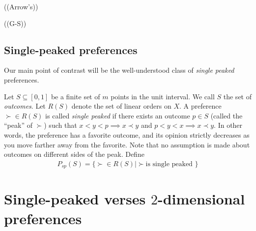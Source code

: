 \documentclass[12pt]{article}
\newcommand{\1}[1]{\mathds{1}[{#1}]}
\begin{document}
    ((Arrow's))

    ((G-S))

  \subsection{Single-peaked preferences}
    Our main point of contrast will be the well-understood class of
    \emph{single peaked} preferences.

    Let $S\subseteq [0,1]$ be a finite set of $m$ points in the unit interval.
    We call $S$ the set of \emph{outcomes}.
    Let $R(S)$ denote the set of linear orders on $X$.
    A preference $\succ \in R(S)$ is called \emph{single peaked} if
    there exists an outcome $p\in S$ (called the ``peak'' of $\succ$)
    such that $x < y < p \implies x \prec y$ and $p < y < x \implies x \prec y$.
    In other words, the preference has a favorite outcome,
    and its opinion strictly decreases as you move farther away from the favorite.
    Note that no assumption is made about outcomes on different sides of the peak.
    Define
    \begin{align*}
      P_{sp}(S) = \{ \succ \in R(S) | \succ \text{is single peaked }\}
    \end{align*}


\section{Single-peaked verses $2$-dimensional preferences}
\end{document}
